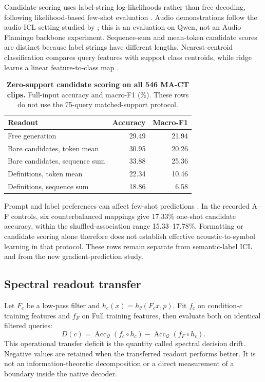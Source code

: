 \documentclass{article}
\newcommand{\Qset}{\mathcal Q}
\begin{document}
Candidate scoring uses label-string log-likelihoods rather than free decoding, following likelihood-based few-shot evaluation \citep{brown2020language}. Audio demonstrations follow the audio-ICL setting studied by \citet{kong2024audioflamingo}; this is an evaluation on Qwen, not an Audio Flamingo backbone experiment. Sequence-sum and mean-token candidate scores are distinct because label strings have different lengths. Nearest-centroid classification compares query features with support class centroids, while ridge learns a linear feature-to-class map \citep{hoerl1970ridge,hastie2009elements}.

\begin{table}[htbp]
\caption{\textbf{Zero-support candidate scoring on all 546 MA-CT clips.} Full-input accuracy and macro-F1 (\%). These rows do not use the 75-query matched-support protocol.}
\label{tab:candidates}
\centering\small
\begin{tabular}{@{}lrr@{}}
\toprule
Readout & Accuracy & Macro-F1 \\
\midrule
Free generation & 29.49 & 21.94 \\
Bare candidates, token mean & 30.95 & 20.26 \\
Bare candidates, sequence sum & 33.88 & 25.36 \\
Definitions, token mean & 22.34 & 10.46 \\
Definitions, sequence sum & 18.86 & 6.58 \\
\bottomrule
\end{tabular}
\end{table}

Prompt and label preferences can affect few-shot predictions \citep{zhao2021calibrate}. In the recorded A--F controls, six counterbalanced mappings give 17.33\% one-shot candidate accuracy, within the shuffled-association range 15.33--17.78\%. Formatting or candidate scoring alone therefore does not establish effective acoustic-to-symbol learning in that protocol. These rows remain separate from semantic-label ICL and from the new gradient-prediction study.

\subsection{Spectral readout transfer}
\label{app:spectral}
Let $F_c$ be a low-pass filter and $h_c(x)=h_\theta(F_c x,p)$. Fit $f_c$ on condition-$c$ training features and $f_F$ on Full training features, then evaluate both on identical filtered queries:
\begin{equation}
D(c)=\operatorname{Acc}_{\Qset}(f_c\circ h_c)
-\operatorname{Acc}_{\Qset}(f_F\circ h_c).
\label{eq:drift}
\end{equation}
This operational transfer deficit is the quantity called spectral decision drift. Negative values are retained when the transferred readout performs better. It is not an information-theoretic decomposition or a direct measurement of a boundary inside the native decoder.
\end{document}
